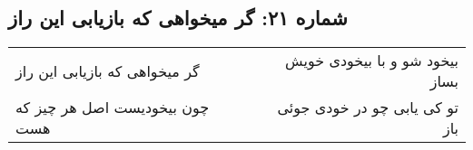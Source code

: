 \begin{center}
\section*{شماره ۲۱: گر میخواهی که بازیابی این راز}
\label{sec:021}
\begin{longtable}{l p{0.5cm} r}
گر میخواهی که بازیابی این راز
&&
بیخود شو و با بیخودی خویش بساز
\\
چون بیخودیست اصل هر چیز که هست
&&
تو کی یابی چو در خودی جوئی باز
\\
\end{longtable}
\end{center}
